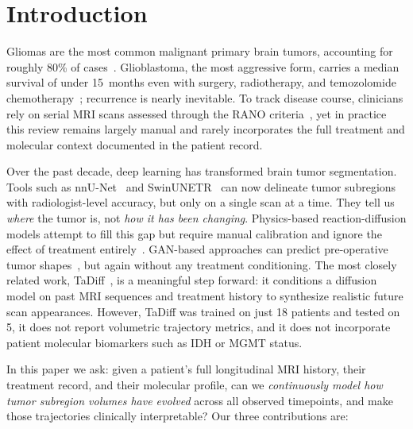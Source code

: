 \documentclass[conference]{IEEEtran}
\begin{document}
\IEEEpeerreviewmaketitle

\section{Introduction}

Gliomas are the most common malignant primary brain tumors, accounting for roughly 80\% of cases~\cite{stupp2005glioblastoma, osborn2022who}. Glioblastoma, the most aggressive form, carries a median survival of under 15~months even with surgery, radiotherapy, and temozolomide chemotherapy~\cite{stupp2005glioblastoma}; recurrence is nearly inevitable. To track disease course, clinicians rely on serial MRI scans assessed through the RANO criteria~\cite{wen2010rano}, yet in practice this review remains largely manual and rarely incorporates the full treatment and molecular context documented in the patient record.

Over the past decade, deep learning has transformed brain tumor segmentation. Tools such as nnU-Net~\cite{isensee2021nnunet} and SwinUNETR~\cite{tang2022swinunetr} can now delineate tumor subregions with radiologist-level accuracy, but only on a single scan at a time. They tell us \emph{where} the tumor is, not \emph{how it has been changing}. Physics-based reaction-diffusion models attempt to fill this gap but require manual calibration and ignore the effect of treatment entirely~\cite{liu2023tadiff}. GAN-based approaches can predict pre-operative tumor shapes~\cite{liu2023tadiff}, but again without any treatment conditioning. The most closely related work, TaDiff~\cite{liu2023tadiff}, is a meaningful step forward: it conditions a diffusion model on past MRI sequences and treatment history to synthesize realistic future scan appearances. However, TaDiff was trained on just 18 patients and tested on 5, it does not report volumetric trajectory metrics, and it does not incorporate patient molecular biomarkers such as IDH or MGMT status.

In this paper we ask: given a patient's full longitudinal MRI history, their treatment record, and their molecular profile, can we \emph{continuously model how tumor subregion volumes have evolved} across all observed timepoints, and make those trajectories clinically interpretable? Our three contributions are:
\end{document}
